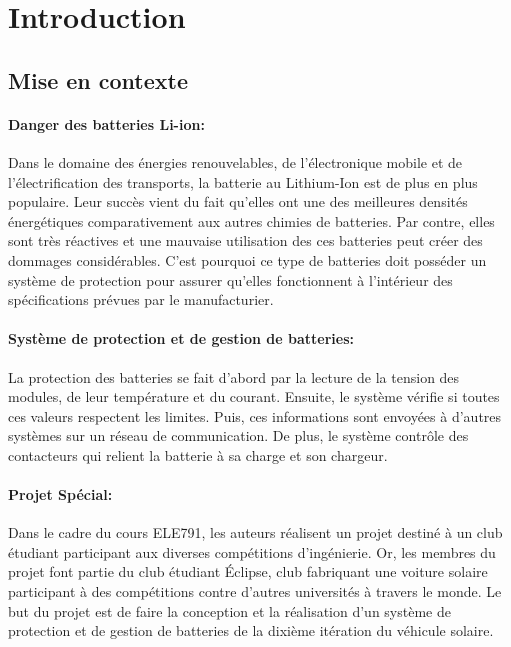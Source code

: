 \section{Introduction}

	\subsection{Mise en contexte}
		\paragraph*{Danger des batteries Li-ion:}
		Dans le domaine des énergies renouvelables, de l'électronique mobile et de l'électrification des transports, la batterie au Lithium-Ion est de plus en plus populaire. Leur succès vient du fait qu'elles ont une des meilleures densités énergétiques comparativement aux autres chimies de batteries. Par contre, elles sont très réactives et une mauvaise utilisation des ces batteries peut créer des dommages considérables. C'est pourquoi ce type de batteries doit posséder un système de protection pour assurer qu'elles fonctionnent à l'intérieur des spécifications prévues par le manufacturier.
		
		\paragraph*{Système de protection et de gestion de batteries:}
		La protection des batteries se fait d'abord par la lecture de la tension des modules, de leur température et du courant. Ensuite, le système vérifie si toutes ces valeurs respectent les limites. Puis, ces informations sont envoyées à d'autres systèmes sur un réseau de communication. De plus, le système contrôle des contacteurs qui relient la batterie à sa charge et son chargeur.
		
		\paragraph*{Projet Spécial:}		
		Dans le cadre du cours ELE791, les auteurs réalisent un projet destiné à un club étudiant participant aux diverses compétitions d'ingénierie. Or, les membres du projet font partie du club étudiant Éclipse, club fabriquant une voiture solaire participant à des compétitions contre d'autres universités à travers le monde. Le but du projet est de faire la conception et la réalisation d'un système de protection et de gestion de batteries de la dixième itération du véhicule solaire. 
		
